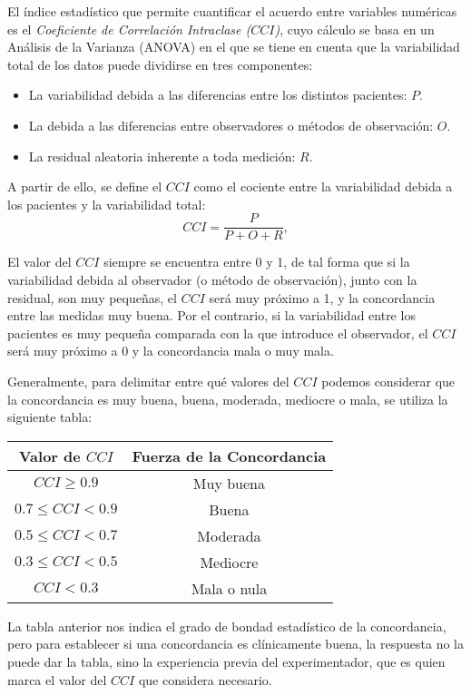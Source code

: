 El índice estadístico que permite cuantificar el acuerdo entre variables numéricas es el \emph{Coeficiente de
Correlación Intraclase ($CCI$)}, cuyo cálculo se basa en un Análisis de la Varianza (ANOVA) en el que se tiene en cuenta
que la variabilidad total de los datos puede dividirse en tres componentes:
\begin{itemize}
\item La variabilidad debida a las diferencias entre los distintos pacientes: $P$.
\item La debida a las diferencias entre observadores o métodos de observación: $O$.
\item La residual aleatoria inherente a toda medición: $R$.
\end{itemize}

A partir de ello, se define el $CCI$ como el cociente entre la variabilidad debida a los pacientes y la variabilidad total:
\[
CCI  = \frac{P} {P+O+R},
\]

El valor del $CCI$ siempre se encuentra entre 0 y 1, de tal forma que si la variabilidad debida al observador (o método
de observación), junto con la residual, son muy pequeñas, el $CCI$ será muy próximo a 1, y la concordancia entre las
medidas muy buena. Por el contrario, si la variabilidad entre los pacientes es muy pequeña comparada con la que
introduce el observador, el $CCI$ será muy próximo a 0 y la concordancia mala o muy mala.

Generalmente, para delimitar entre qué valores del $CCI$ podemos considerar que la concordancia es muy buena, buena,
moderada, mediocre o mala, se utiliza la siguiente tabla:

\begin{center}
\begin{tabular}{|c|c|}
\hline
Valor de $CCI$ & Fuerza de la Concordancia \\
\hline\hline
$CCI \geq 0.9$ & Muy buena  \\
\hline
$0.7\leq CCI<0.9$ & Buena  \\
\hline
$0.5\leq CCI<0.7$ & Moderada  \\
\hline
$0.3\leq CCI<0.5$ & Mediocre  \\
\hline
$CCI<0.3$ & Mala o nula  \\
\hline
\end{tabular}
\end{center}

La tabla anterior nos indica el grado de bondad estadístico de la concordancia, pero para establecer si una concordancia
es clínicamente buena, la respuesta no la puede dar la tabla, sino la experiencia previa del experimentador, que es
quien marca el valor del $CCI$ que considera necesario.


